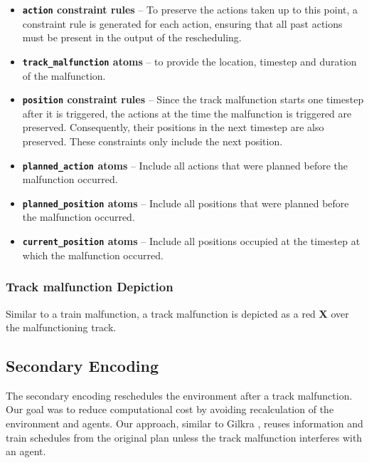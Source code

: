 \documentclass[runningheads]{llncs}
\begin{document}
\begin{itemize}
    \item \textbf{\texttt{action} constraint rules} -- To preserve the actions taken up to this point, a constraint rule is generated for each action, ensuring that all past actions must be present in the output of the rescheduling.

    \item \textbf{\texttt{track\_malfunction} atoms} -- to provide the location, timestep and duration of the malfunction.

    \item \textbf{\texttt{position} constraint rules} -- Since the track malfunction starts one timestep after it is triggered, the actions at the time the malfunction is triggered are preserved. Consequently, their positions in the next timestep are also preserved. These constraints only include the next position.

    \item \textbf{\texttt{planned\_action} atoms} -- Include all actions that were planned before the malfunction occurred.

    \item \textbf{\texttt{planned\_position} atoms} -- Include all positions that were planned before the malfunction occurred.

    \item \textbf{\texttt{current\_position} atoms} -- Include all positions occupied at the timestep at which the malfunction occurred.
\end{itemize}

\subsubsection{Track malfunction Depiction}

Similar to a train malfunction, a track malfunction is depicted as a red \textbf{X} over the malfunctioning track.


\subsection{Secondary Encoding} \label{encoding_2}

The secondary encoding reschedules the environment after a track malfunction. Our goal was to reduce computational cost by avoiding recalculation of the environment and agents. Our approach, similar to Gilkra \cite{gilkra2025}, reuses information and train schedules from the original plan unless the track malfunction interferes with an agent. 
\end{document}
